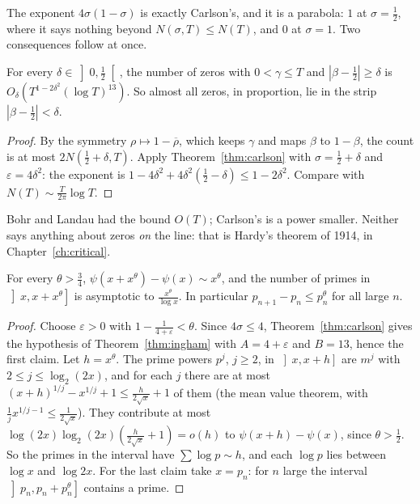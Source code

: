 The exponent $4\sigma(1-\sigma)$ is exactly Carlson's, and it is a parabola: $1$ at $\sigma=\frac12$, where it says nothing beyond $N(\sigma,T)\le N(T)$, and $0$ at $\sigma=1$. Two consequences follow at once.

\begin{corollary}\label{cor:bohrlandau}
For every $\delta\in\left]0,\frac12\right[$, the number of zeros with $0<\gamma\le T$ and $|\beta-\frac12|\ge\delta$ is $O_\delta(T^{1-2\delta^2}(\log T)^{13})$. So almost all zeros, in proportion, lie in the strip $|\beta-\frac12|<\delta$.
\end{corollary}
\begin{proof}
By the symmetry $\rho\mapsto1-\overline\rho$, which keeps $\gamma$ and maps $\beta$ to $1-\beta$, the count is at most $2N(\frac12+\delta,T)$. Apply Theorem~\ref{thm:carlson} with $\sigma=\frac12+\delta$ and $\varepsilon=4\delta^2$: the exponent is $1-4\delta^2+4\delta^2(\frac12-\delta)\le1-2\delta^2$. Compare with $N(T)\sim\frac T{2\pi}\log T$.
\end{proof}

Bohr and Landau had the bound $O(T)$; Carlson's is a power smaller. Neither says anything about zeros \emph{on} the line: that is Hardy's theorem of 1914, in Chapter~\ref{ch:critical}.

\begin{corollary}\label{cor:hoheisel}
For every $\theta>\frac34$, $\psi(x+x^\theta)-\psi(x)\sim x^\theta$, and the number of primes in $\left]x,x+x^\theta\right]$ is asymptotic to $\frac{x^\theta}{\log x}$. In particular $p_{n+1}-p_n\le p_n^\theta$ for all large $n$.
\end{corollary}
\begin{proof}
Choose $\varepsilon>0$ with $1-\frac1{4+\varepsilon}<\theta$. Since $4\sigma\le4$, Theorem~\ref{thm:carlson} gives the hypothesis of Theorem~\ref{thm:ingham} with $A=4+\varepsilon$ and $B=13$, hence the first claim. Let $h=x^\theta$. The prime powers $p^j$, $j\ge2$, in $\left]x,x+h\right]$ are $m^j$ with
$2\le j\le\log_2(2x)$, and for each $j$ there are at most $(x+h)^{1/j}-x^{1/j}+1\le\frac{h}{2\sqrt x}+1$ of them (the mean value theorem, with $\frac1jx^{1/j-1}\le\frac1{2\sqrt x}$). They contribute at most $\log(2x)\log_2(2x)(\frac h{2\sqrt x}+1)=o(h)$ to $\psi(x+h)-\psi(x)$, since $\theta>\frac12$. So the primes in
the interval have $\sum\log p\sim h$, and each $\log p$ lies between $\log x$ and $\log 2x$. For the last claim take $x=p_n$: for $n$ large the interval $\left]p_n,p_n+p_n^\theta\right]$ contains a prime.
\end{proof}

